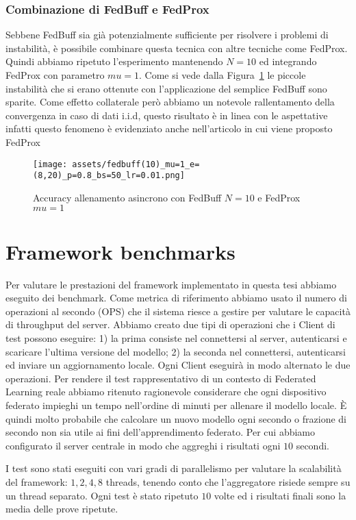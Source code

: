 \documentclass[a4paper, oneside, openright]{report}
\let\oldsection\section
\renewcommand{\section}{\newpage\oldsection}
\begin{document}
\subsubsection*{Combinazione di FedBuff e FedProx }
Sebbene FedBuff sia già potenzialmente sufficiente per risolvere i problemi di instabilità, è possibile combinare questa tecnica con altre tecniche come FedProx. Quindi abbiamo ripetuto l'esperimento mantenendo $N=10$ ed integrando FedProx con parametro $mu=1$. Come si vede dalla Figura~\ref{fig:fed-buff2} le piccole instabilità che si erano ottenute con l'applicazione del semplice FedBuff sono sparite. Come effetto collaterale però abbiamo un notevole rallentamento della convergenza in caso di dati i.i.d, questo risultato è in linea con le aspettative infatti questo fenomeno è evidenziato anche nell'articolo in cui viene proposto FedProx~\cite{DBLP:journals/corr/abs-1812-06127}

\begin{figure}[h!]
\centering
\texttt{[image: assets/fedbuff(10)\_mu=1\_e=(8,20)\_p=0.8\_bs=50\_lr=0.01.png]}
\caption{Accuracy allenamento asincrono con FedBuff $N=10$ e FedProx $mu=1$}\label{fig:fed-buff2}
\end{figure}

 \section{Framework benchmarks}
Per valutare le prestazioni del framework implementato in questa tesi abbiamo eseguito dei benchmark. Come metrica di riferimento abbiamo usato il numero di operazioni al secondo (OPS) che il sistema riesce a gestire per valutare le capacità di throughput del server. Abbiamo creato due tipi di operazioni che i Client di test possono eseguire: 1) la prima consiste nel connettersi al server, autenticarsi e scaricare l'ultima versione del modello; 2) la seconda nel connettersi, autenticarsi ed inviare un aggiornamento locale. Ogni Client eseguirà in modo alternato le due operazioni. 
Per rendere il test rappresentativo di un contesto di Federated Learning reale abbiamo ritenuto ragionevole considerare che ogni dispositivo federato impieghi un tempo nell'ordine di minuti per allenare il modello locale. È quindi molto probabile che calcolare un nuovo modello ogni secondo o frazione di secondo non sia utile ai fini dell'apprendimento federato. Per cui abbiamo configurato il server centrale in modo che aggreghi i risultati ogni $10$ secondi.

I test sono stati eseguiti con vari gradi di parallelismo per valutare la scalabilità del framework: $1, 2, 4, 8$ threads, tenendo conto che l'aggregatore risiede sempre su un thread separato. Ogni test è stato ripetuto $10$ volte ed i risultati finali sono la media delle prove ripetute.
\end{document}
